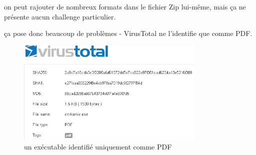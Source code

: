 on peut rajouter de nombreux formats dans le fichier Zip lui-même, mais ça ne présente aucun challenge particulier.

ça pose donc beaucoup de problèmes - VirusTotal ne l'identifie que comme PDF.
\begin{figure}[ht]
  \centering
  \includegraphics[width=0.8\textwidth]{albertini/img/corkamix-vt}
  \caption{un exécutable identifié uniquement comme PDF}
  \label{fig:albertini:corkamix-vt}
\end{figure}



